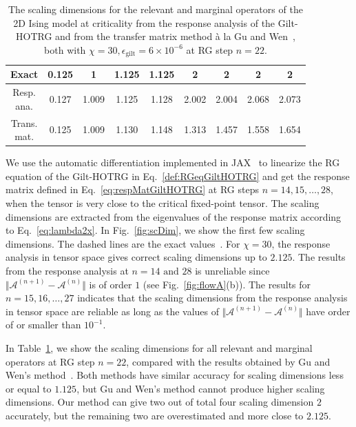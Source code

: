 \documentclass[aps,prb,reprint,superscriptaddress,floatfix]{revtex4-2}
\begin{document}
%
\begin{table}[h]%
\caption{The scaling dimensions for the relevant and marginal operators
    of the 2D Ising model at criticality from the response analysis of
    the Gilt-HOTRG and from the transfer matrix method \`a la Gu and
    Wen~\cite{GuWen2009}, both with $\chi = 30, \epsilon_{\text{gilt}} =
    6\times 10^{-6}$ at RG step $n = 22$.\label{table:scDim}} 
\begin{ruledtabular}
\begin{tabular}{ c c c c c c c c c }
Exact      & 0.125 & 1 & 1.125 & 1.125 & 2 & 2 & 2 & 2 \\
\hline
\thead{Resp.\\ ana.} & 0.127 & 1.009 & 1.125 & 1.128 & 2.002 &
2.004 & 2.068 & 2.073 \\
\thead{Trans.\\ mat.} & 0.125 & 1.009 & 1.130 & 1.148 & 1.313 &
1.457 & 1.558 & 1.654
\end{tabular}
\end{ruledtabular}
\end{table}
%

We use the automatic differentiation implemented in
JAX~\cite{jax2018github} to linearize the RG equation of the Gilt-HOTRG in
Eq.~\eqref{def:RGeqGiltHOTRG} and get the response matrix defined in
Eq.~\eqref{eq:respMatGiltHOTRG} at RG steps $n = 14,15,\ldots, 28$, when the
tensor is very close to the critical fixed-point tensor. The scaling
dimensions are extracted from the eigenvalues of the response matrix
according to Eq.~\eqref{eq:lambda2x}. In Fig.~\ref{fig:scDim}, we show
the first few scaling dimensions. The dashed lines are the exact
values~\cite{DiFrancesco1997}. For $\chi = 30$, the response analysis in
tensor space gives correct scaling dimensions up to $2.125$. The results from
the response analysis at $n = 14 \text{ and } 28$ is unreliable since $\Vert
\mathcal{A}^{(n+1)} - \mathcal{A}^{(n)}\Vert$ is of order $1$ (see
Fig.~\ref{fig:flowA}(b)). The results for $n = 15,16,\ldots,27$
indicates that the scaling dimensions from the response analysis in tensor
space are reliable as long as the values of $\Vert \mathcal{A}^{(n+1)} -
\mathcal{A}^{(n)}\Vert$ have order of or smaller than $10^{-1}$. 
%

In Table~\ref{table:scDim}, we show the scaling dimensions for all
relevant and marginal operators at RG step $n = 22$, compared with
the results obtained by Gu and Wen's method~\cite{GuWen2009}. Both
methods have similar accuracy for scaling dimensions less or equal to
$1.125$, but Gu and Wen's method cannot produce higher scaling
dimensions. Our method can give two out of total four scaling dimension
$2$ accurately, but the remaining two are overestimated and more close
to $2.125$.
%
\end{document}
